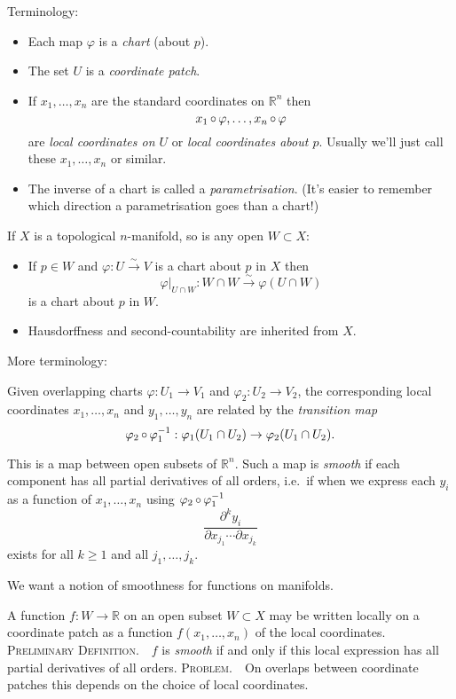 \documentclass[a4paper,11pt]{article}
\begin{document}
	Terminology:
	\begin{itemize}
		\item Each map $\varphi$ is a \emph{chart} (about $p$).
		\item The set $U$ is a \emph{coordinate patch}.
		\item If $x_1, \dots, x_n$ are the standard coordinates on $\mathbb{R}^n$ then
		\[
			x_1 \operatorname{\circ} \varphi, \dots , x_n \operatorname{\circ} \varphi
		\]
		are \emph{local coordinates on $U$} or \emph{local coordinates about $p$}. Usually we'll just call these $x_1, \dots , x_n$ or similar.
		\item The inverse of a chart is called a \emph{parametrisation}. (It's easier to remember which direction a parametrisation goes than a chart!)
	\end{itemize}

	\begin{ex}
		If $X$ is a topological $n$-manifold, so is any open $W \subset X$:
		\begin{itemize}
			\item If $p \in W$ and $\varphi: U \xrightarrow{\sim} V$ is a chart about $p$ in $X$ then \[
				\varphi|_{U \cap W}: W \cap W \xrightarrow{\sim} \varphi(U \cap W)
			\]
			is a chart about $p$ in $W$.
			\item Hausdorffness and second-countability are inherited from $X$.
		\end{itemize}
	\end{ex}

	More terminology:

	Given overlapping charts $\varphi: U_1 \to V_1$ and $\varphi_2 : U_2 \to V_2$, the corresponding local coordinates $x_1, \dots , x_n$ and $y_1, \dots, y_n$ are related by the \emph{transition map}
	\[
		\varphi_2 \operatorname{\circ} \varphi_1^{-1} : \varphi_1 (U_1 \cap U_2) \to \varphi_2 (U_1 \cap U_2).
	\]
	
	This is a map between open subsets of $\mathbb{R}^n$. Such a map is \emph{smooth} if each component has all partial derivatives of all orders, i.e.\ if when we express each $y_i$ as a function of $x_1, \dots , x_n$ using $\varphi_2 \operatorname{\circ} \varphi_1^{-1}$ 
	\[
		\frac{\partial^k y_i}{\partial x_{j_1} \cdots \partial x_{j_k}}
	\]
	exists for all $k \geq 1$ and all $j_1, \dots , j_k$.

	We want a notion of smoothness for functions on manifolds.

	A function $f: W \to \mathbb{R}$ on an open subset $W \subset X$ may be written locally on a coordinate patch as a function $f(x_1,\dots,x_n)$ of the local coordinates.
	{\large \scshape Preliminary Definition.}\ \ $f$ is \emph{smooth} if and only if this local expression has all partial derivatives of all orders.
	{\large \scshape Problem.}\ \ On overlaps between coordinate patches this depends on the choice of local coordinates.
\end{document}
